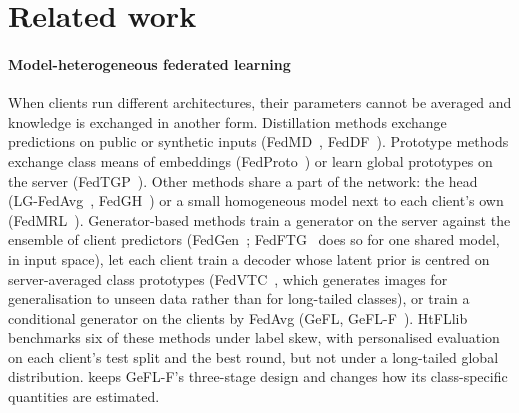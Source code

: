 \section{Related work}\label{sec:related}

\paragraph{Model-heterogeneous federated learning} When clients run different architectures, their parameters cannot
be averaged and knowledge is exchanged in another form. Distillation methods exchange predictions on public or
synthetic inputs (FedMD~\cite{li2019fedmd}, FedDF~\cite{lin2020feddf}). Prototype methods exchange class means of
embeddings (FedProto~\cite{tan2022fedproto}) or learn global prototypes on the server (FedTGP~\cite{zhang2024fedtgp}).
Other methods share a part of the network: the head (LG-FedAvg~\cite{liang2020lgfedavg}, FedGH~\cite{yi2023fedgh}) or a
small homogeneous model next to each client's own (FedMRL~\cite{yi2024fedmrl}). Generator-based methods train a
generator on the server against the ensemble of client predictors (FedGen~\cite{zhu2021fedgen}; FedFTG~\cite{zhang2022fedftg}
does so for one shared model, in input space), let each client train a decoder whose latent prior is centred on
server-averaged class prototypes (FedVTC~\cite{niu2026fedvtc}, which generates images for generalisation to unseen
data rather than for long-tailed classes), or train a conditional generator on the clients by FedAvg (GeFL,
GeFL-F~\cite{kang2025gefl}). HtFLlib~\cite{zhang2025htfllib} benchmarks six of these methods under label skew, with
personalised evaluation on each client's test split and the best round, but not under a long-tailed global
distribution. \ours keeps GeFL-F's three-stage design and
changes how its class-specific quantities are estimated.

